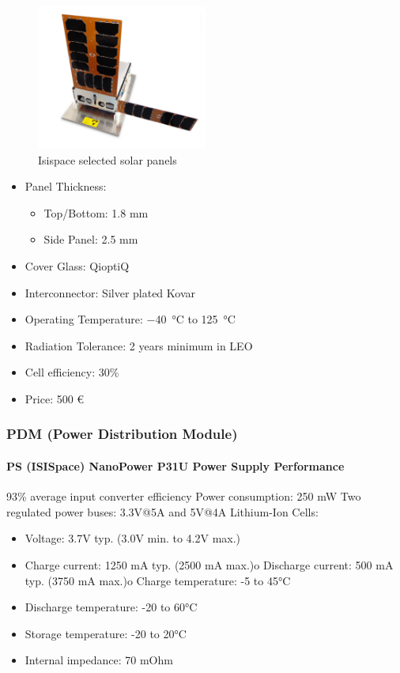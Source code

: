 \begin{figure}[h]
	\centering
	\includegraphics[width=0.5\textwidth]{img/solar_panels.png}
	\caption{Isispace selected solar panels}
	\label{fig:solar_panels}
\end{figure}

\begin{itemize}
	\item Panel Thickness:
	\begin{itemize}
		\item Top/Bottom: 1.8 mm
		\item Side Panel: 2.5 mm
	\end{itemize}
	\item Cover Glass: QioptiQ
	\item Interconnector: Silver plated Kovar
	\item Operating Temperature: \SI{-40}{\degreeCelsius} to \SI{+125}{\degreeCelsius}
	\item Radiation Tolerance: 2 years minimum in LEO
	\item Cell efficiency: 30\%
	\item Price: 500 \euro
\end{itemize}

\subsubsection{PDM (Power Distribution Module)}

\paragraph{PS (ISISpace) NanoPower P31U Power Supply Performance}

93\% average input converter efficiency
Power consumption: 250 mW
Two regulated power buses: 3.3V@5A and 5V@4A
Lithium-Ion Cells:
\begin{itemize}
	\item Voltage: 3.7V typ. (3.0V min. to 4.2V max.)
	\item Charge current: 1250 mA typ. (2500 mA max.)o Discharge current: 500 mA typ. (3750 mA max.)o Charge temperature: -5 to 45°C
	\item Discharge temperature: -20 to 60°C
	\item Storage temperature: -20 to 20°C
	\item Internal impedance: 70 mOhm
\end{itemize}

